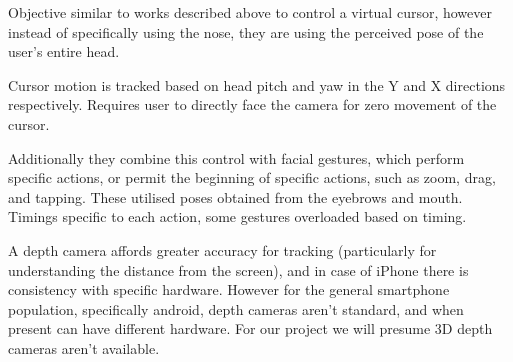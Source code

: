Objective similar to works described above to control a virtual cursor, however instead of specifically using the nose, they are using the perceived pose of the user's entire head.

Cursor motion is tracked based on head pitch and yaw in the Y and X directions respectively. Requires user to directly face the camera for zero movement of the cursor.

Additionally they combine this control with facial gestures, which perform specific actions, or permit the beginning of specific actions, such as zoom, drag, and tapping.
These utilised poses obtained from the eyebrows and mouth. Timings specific to each action, some gestures overloaded based on timing.


A depth camera affords greater accuracy for tracking (particularly for understanding the distance from the screen), and in case of iPhone there is consistency with specific hardware. 
However for the general smartphone population, specifically android, depth cameras aren't standard, and when present can have different hardware. 
For our project we will presume 3D depth cameras aren't available.

